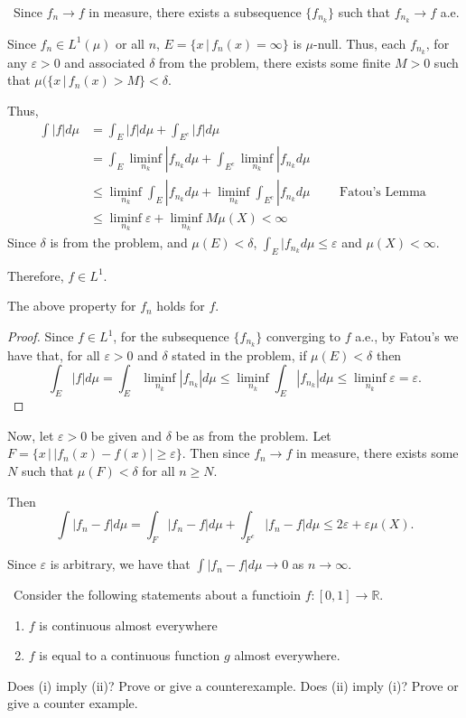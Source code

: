 \documentclass[12pt]{Homework}
\begin{document}
\begin{solution}$\,$
Since $f_n\to f$ in measure, there exists a subsequence $\{f_{n_k}\}$ such that $f_{n_k}\to f$ a.e.

Since $f_n\in L^1(\mu)$ or all $n$, $E=\{x\,|\,f_n(x)=\infty\}$ is $\mu$-null. Thus, each $f_{n_k}$, for any $\varepsilon>0$ and associated $\delta$ from the problem, there exists some finite $M>0$ such that $\mu(\{x\,|\,f_n(x)>M\}<\delta$.

Thus, \begin{align*}
    \int|f|d\mu&=\int_E|f|d\mu+\int_{E^c}|f|d\mu\\
    &=\int_E\liminf_{n_k}|f_{n_k}d\mu+\int_{E^c}\liminf_{n_k}|f_{n_k}d\mu\\
    &\le \liminf_{n_k}\int_E|f_{n_k}d\mu+\liminf_{n_k}\int_{E^c}|f_{n_k}d\mu\qquad\text{ Fatou's Lemma }\\
    &\le \liminf_{n_k}\varepsilon+\liminf_{n_k}M\mu(X)<\infty \tag{1}
\end{align*}
 Since $\delta$ is from the problem, and $\mu(E)<\delta$, $\int_E|f_{n_k}d\mu\le \varepsilon$ and $\mu(X)<\infty$. 

Therefore, $f\in L^1$. 

\begin{claim} The above property for $f_n$ holds for $f$.
\begin{proof} Since $f\in L^1$, for the subsequence $\{f_{n_k}\}$ converging to $f$ a.e., by Fatou's we have that, for all $\varepsilon>0$ and $\delta$ stated in the problem, if $\mu(E)<\delta$ then
$$\int_E|f|d\mu=\int_E\liminf_{n_k}|f_{n_k}|d\mu\le \liminf_{n_k}\int_E|f_{n_k}|d\mu\le\liminf_{n_k}\varepsilon=\varepsilon.$$
\end{proof}
\end{claim}

Now, let $\varepsilon>0$ be given and $\delta$ be as from the problem. Let $F=\{x\,|\,|f_n(x)-f(x)|\ge\varepsilon\}$. Then since $f_n\to f$ in measure, there exists some $N$ such that $\mu(F)<\delta$ for all $n\ge N$.

Then $$\int|f_n-f|d\mu=\int_F|f_n-f|d\mu+\int_{F^c}|f_n-f|d\mu\le 2\varepsilon+\varepsilon\mu(X).$$

Since $\varepsilon$ is arbitrary, we have that $\int|f_n-f|d\mu\to 0$ as $n\to\infty.$
\end{solution}
\newpage

\begin{problem}[Folland, 2.3.25, p.59] $\,$
Consider the following statements about a functioin $f:[0,1]\to\mathbb{R}$.
\begin{enumerate}[label=(\roman*)]
    \item $f$ is continuous almost everywhere
    \item $f$ is equal to a continuous function $g$ almost everywhere.
\end{enumerate}

Does (i) imply (ii)? Prove or give a counterexample. Does (ii) imply (i)? Prove or give a counter example.
\end{problem}
\end{document}
